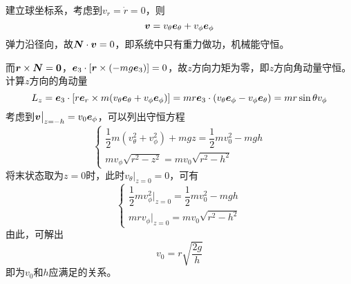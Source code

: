 \begin{solution}
建立球坐标系，考虑到$v_r = \dot{r} = 0$，则
\begin{equation*}
	\boldsymbol{v} = v_\theta \boldsymbol{e}_\theta + v_\phi \boldsymbol{e}_\phi
\end{equation*}
弹力沿径向，故$\boldsymbol{N} \cdot \boldsymbol{v} = 0$，即系统中只有重力做功，机械能守恒。

而$\boldsymbol{r} \times \boldsymbol{N} = \boldsymbol{0}$，$\boldsymbol{e}_3 \cdot \left[\boldsymbol{r} \times (-mg\boldsymbol{e}_3)\right] = 0$，故$z$方向力矩为零，即$z$方向角动量守恒。计算$z$方向的角动量
\begin{equation*}
	L_z = \boldsymbol{e}_3 \cdot \left[r\boldsymbol{e}_r \times m(v_\theta\boldsymbol{e}_\theta + v_\phi \boldsymbol{e}_\phi)\right] = mr\boldsymbol{e}_3 \cdot (v_\theta\boldsymbol{e}_\phi - v_\phi\boldsymbol{e}_\theta) = mr\sin \theta v_\phi
\end{equation*}
考虑到$\boldsymbol{v}\big|_{z=-h} = v_0 \boldsymbol{e}_\phi$，可以列出守恒方程
\begin{equation*}
	\begin{cases}
		\dfrac12 m(v_\theta^2 + v_\phi^2) + mgz = \dfrac12 mv_0^2 - mgh \\[1.5ex]
		mv_\phi \sqrt{r^2-z^2} = mv_0\sqrt{r^2-h^2}
	\end{cases}
\end{equation*}
将末状态取为$z=0$时，此时$v_\theta\big|_{z=0} = 0$，可有
\begin{equation*}
	\begin{cases}
		\dfrac12 mv_\phi^2\big|_{z=0} = \dfrac12 mv_0^2 - mgh \\
		mrv_\phi\big|_{z=0} = mv_0 \sqrt{r^2-h^2}
	\end{cases}
\end{equation*}
由此，可解出
\begin{equation*}
	v_0 = r\sqrt{\frac{2g}{h}}
\end{equation*}
即为$v_0$和$h$应满足的关系。
\end{solution}


